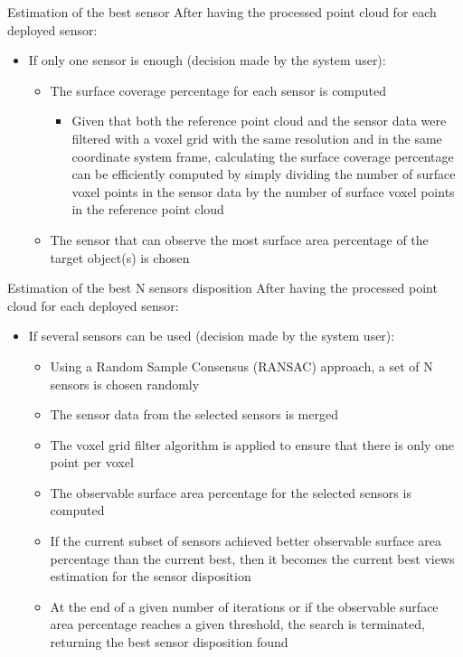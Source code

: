 \begin{frame}{Estimation of the best sensor}
	After having the processed point cloud for each deployed sensor:
	\begin{itemize}
		\item If only one sensor is enough (decision made by the system user):
		\begin{itemize}
			\item The surface coverage percentage for each sensor is computed
			\begin{itemize}
				\item Given that both the reference point cloud and the sensor data were filtered with a voxel grid with the same resolution and in the same coordinate system frame, calculating the surface coverage percentage can be efficiently computed by simply dividing the number of surface voxel points in the sensor data by the number of surface voxel points in the reference point cloud
			\end{itemize}
			\item The sensor that can observe the most surface area percentage of the target object(s) is chosen
		\end{itemize}
	\end{itemize}
\end{frame}


\begin{frame}{Estimation of the best N sensors disposition}
	After having the processed point cloud for each deployed sensor:
	\begin{itemize}
		\item If several sensors can be used (decision made by the system user):
		\begin{itemize}
			\item Using a Random Sample Consensus (RANSAC) approach, a set of N sensors is chosen randomly
			\item The sensor data from the selected sensors is merged
			\item The voxel grid filter algorithm is applied to ensure that there is only one point per voxel
			\item The observable surface area percentage for the selected sensors is computed
			\item If the current subset of sensors achieved better observable surface area percentage than the current best, then it becomes the current best views estimation for the sensor disposition
			\item At the end of a given number of iterations or if the observable surface area percentage reaches a given threshold, the search is terminated, returning the best sensor disposition found
		\end{itemize}
	\end{itemize}
\end{frame}


